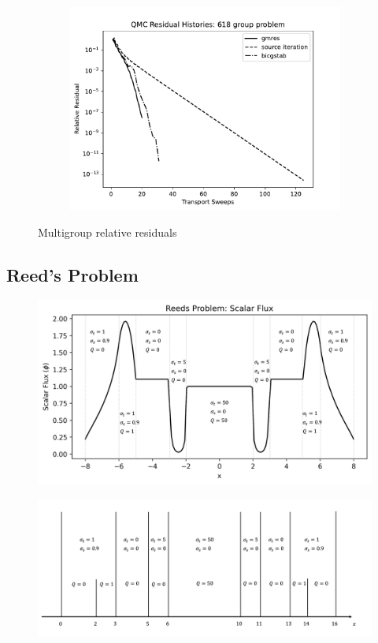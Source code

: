 \begin{figure}
\begin{subfigure}[b]{0.45\textwidth}
         \centering
         \includegraphics[width=\textwidth]{FIGURES/618Group.pdf}
         \caption{\label{fig:12group}}
     \end{subfigure}
        \caption{Multigroup relative residuals}
        \label{fig:multigroup}
\end{figure}


\subsection{Reed's Problem}

\begin{figure}[h]
\centerline{
\includegraphics[width=5.5in]{FIGURES/Reeds_problem2.png}
}
\caption{\label{fig:reeds}}
\end{figure}

\begin{figure}[h]
\centerline{
\includegraphics[width=5.0in]{FIGURES/Reeds_problem.png}
}
\caption{\label{fig:reeds}}
\end{figure}